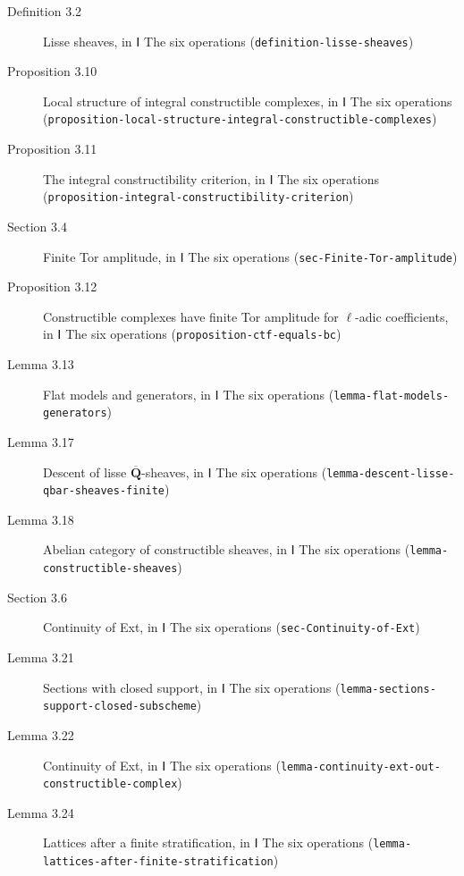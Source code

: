 \documentclass[11pt]{article}
\newcommand{\bpslug}[1]{\texttt{#1}}
\providecommand{\Qbar}{}\renewcommand{\Qbar}{\overline{\mathbf Q}}
\begin{document}
\begin{description}
\item[Definition 3.2] Lisse sheaves, in Ⅰ The six operations (\bpslug{definition-{}\allowbreak{}lisse-{}\allowbreak{}sheaves})
\item[Proposition 3.10] Local structure of integral constructible complexes, in Ⅰ The six operations (\bpslug{proposition-{}\allowbreak{}local-{}\allowbreak{}structure-{}\allowbreak{}integral-{}\allowbreak{}constructible-{}\allowbreak{}complexes})
\item[Proposition 3.11] The integral constructibility criterion, in Ⅰ The six operations (\bpslug{proposition-{}\allowbreak{}integral-{}\allowbreak{}constructibility-{}\allowbreak{}criterion})
\item[Section 3.4] Finite Tor amplitude, in Ⅰ The six operations (\bpslug{sec-{}\allowbreak{}Finite-{}\allowbreak{}Tor-{}\allowbreak{}amplitude})
\item[Proposition 3.12] Constructible complexes have finite Tor amplitude for $\ell$-adic coefficients, in Ⅰ The six operations (\bpslug{proposition-{}\allowbreak{}ctf-{}\allowbreak{}equals-{}\allowbreak{}bc})
\item[Lemma 3.13] Flat models and generators, in Ⅰ The six operations (\bpslug{lemma-{}\allowbreak{}flat-{}\allowbreak{}models-{}\allowbreak{}generators})
\item[Lemma 3.17] Descent of lisse $\Qbar$-sheaves, in Ⅰ The six operations (\bpslug{lemma-{}\allowbreak{}descent-{}\allowbreak{}lisse-{}\allowbreak{}qbar-{}\allowbreak{}sheaves-{}\allowbreak{}finite})
\item[Lemma 3.18] Abelian category of constructible sheaves, in Ⅰ The six operations (\bpslug{lemma-{}\allowbreak{}constructible-{}\allowbreak{}sheaves})
\item[Section 3.6] Continuity of Ext, in Ⅰ The six operations (\bpslug{sec-{}\allowbreak{}Continuity-{}\allowbreak{}of-{}\allowbreak{}Ext})
\item[Lemma 3.21] Sections with closed support, in Ⅰ The six operations (\bpslug{lemma-{}\allowbreak{}sections-{}\allowbreak{}support-{}\allowbreak{}closed-{}\allowbreak{}subscheme})
\item[Lemma 3.22] Continuity of Ext, in Ⅰ The six operations (\bpslug{lemma-{}\allowbreak{}continuity-{}\allowbreak{}ext-{}\allowbreak{}out-{}\allowbreak{}constructible-{}\allowbreak{}complex})
\item[Lemma 3.24] Lattices after a finite stratification, in Ⅰ The six operations (\bpslug{lemma-{}\allowbreak{}lattices-{}\allowbreak{}after-{}\allowbreak{}finite-{}\allowbreak{}stratification})

\end{description}
\end{document}
